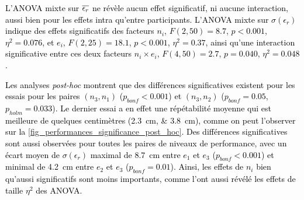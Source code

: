 \textcolor{black}{L'ANOVA mixte sur $\overline{\epsilon_r}$ ne révèle aucun effet significatif, ni aucune interaction, aussi bien pour les effets intra qu'entre participants. L'ANOVA mixte sur $\sigma(\epsilon_r)$ indique des effets significatifs des facteurs $n_i$, $F(2, 50) = 8.7$, $p<0.001$, $\eta^2 = 0.076$, et $e_i$, $F(2,25) = 18.1$, $p < 0.001$, $\eta^2=0.37$, ainsi qu'une interaction significative entre ces deux facteurs $n_i\times e_i$, $F(4, 50) = 2.7$, $p=0.040$,  $\eta^2 = 0.048$.}

\textcolor{black}{Les analyses \textit{post-hoc} montrent que des différences significatives existent pour les essais pour les paires $(n_3, n_1)$ ($p_{bonf}<0.001$) et $(n_3, n_2)$ ($p_{bonf}=0.05$, $p_{holm}=0.033$). Le dernier essai a en effet une répétabilité moyenne qui est meilleure de quelques centimètres (\SIlist{2.3;3.8}{\centi\meter}), comme on peut l'observer sur la \cref{fig_performances_significance_post_hoc}. Des différences significatives sont aussi observées pour toutes les paires de niveaux de performance, avec un écart moyen de $\sigma(\epsilon_r)$ maximal de \SI{8.7}{\centi\meter} entre $e_1$ et $e_3$ ($p_{bonf}<0.001$) et minimal de \SI{4.2}{\centi\meter} entre $e_2$ et $e_3$ ($p_{bonf}=0.01$). %
Ainsi, les effets de $n_i$ bien qu'aussi significatifs sont moins importants, comme l'ont aussi révélé les effets de taille $\eta^2$ des ANOVA. }


